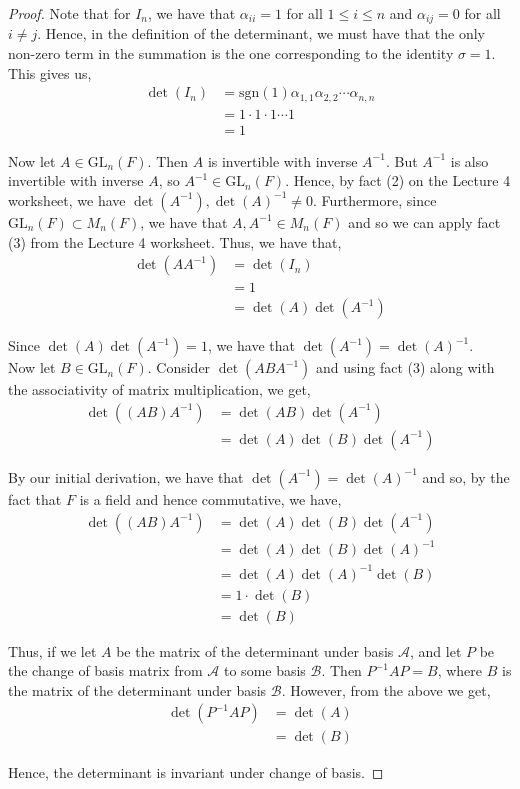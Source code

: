 \documentclass[11pt, reqno]{amsart}
\theoremstyle{plain}
\theoremstyle{definition}
\theoremstyle{example}
\def\GL{\mathrm{GL}} \def\SL{\mathrm{SL}}  \def\SP{\mathrm{SL}}
\def\sgn{\mathrm{sgn}}
\begin{document}
\begin{proof}
Note that for $I_n$, we have that $\alpha_{ii} = 1$ for all $1 \leq i \leq n$ and $\alpha_{ij} = 0$ for all $i \neq j$. Hence, in the definition of the determinant, we must have that the only non-zero term in the summation is the one corresponding to the identity $\sigma = 1$. This gives us,
\begin{align*}
\det(I_n) &= \sgn(1)\alpha_{1,1}\alpha_{2,2}\cdots\alpha_{n,n}\\
&= 1 \cdot 1 \cdot 1 \cdots 1\\
&= 1
\end{align*}

Now let $A \in \GL_n(F)$. Then $A$ is invertible with inverse $A^{-1}$. But $A^{-1}$ is also invertible with inverse $A$, so $A^{-1} \in \GL_n(F)$. Hence, by fact (2) on the Lecture 4 worksheet, we have $\det(A^{-1}), \det(A)^{-1} \neq 0$. Furthermore, since $\GL_n(F) \subset M_n(F)$, we have that $A, A^{-1} \in M_n(F)$ and so we can apply fact (3) from the Lecture 4 worksheet. Thus, we have that,
\begin{align*}
\det(AA^{-1}) &= \det(I_n)\\
&= 1\\
&= \det(A)\det(A^{-1})
\end{align*}

Since $\det(A)\det(A^{-1}) = 1$, we have that $\det(A^{-1}) = \det(A)^{-1}$.\\

Now let $B \in \GL_n(F)$. Consider $\det(ABA^{-1})$ and using fact (3) along with the associativity of matrix multiplication, we get,
\begin{align*}
\det((AB)A^{-1}) &= \det(AB)\det(A^{-1})\\
&= \det(A)\det(B)\det(A^{-1})
\end{align*}

By our initial derivation, we have that $\det(A^{-1}) = \det(A)^{-1}$ and so, by the fact that $F$ is a field and hence commutative, we have,
\begin{align*}
\det((AB)A^{-1}) &= \det(A)\det(B)\det(A^{-1})\\
&= \det(A)\det(B)\det(A)^{-1}\\
&= \det(A)\det(A)^{-1}\det(B)\\
&= 1 \cdot \det(B)\\
&= \det(B)
\end{align*}

Thus, if we let $A$ be the matrix of the determinant under basis $\mathcal{A}$, and let $P$ be the change of basis matrix from $\mathcal{A}$ to some basis $\mathcal{B}$. Then $P^{-1}AP = B$, where $B$ is the matrix of the determinant under basis $\mathcal{B}$. However, from the above we get,
\begin{align*}
\det(P^{-1}AP) &= \det(A)\\
&= \det(B)
\end{align*}

Hence, the determinant is invariant under change of basis.
\end{proof}
\end{document}

